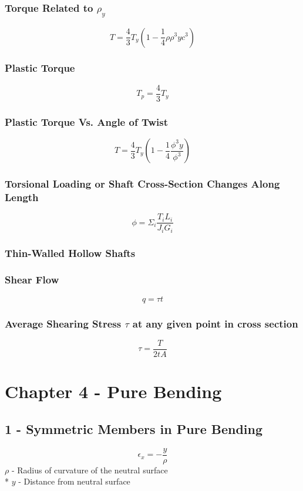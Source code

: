 \documentclass[10pt,landscape]{article}
\begin{document}
\begin{multicols}{3}
\subsubsection{Torque Related to $\rho_y$}
\begin{equation}
    T=\frac{4}{3}T_y(1-\frac{1}{4}\rho{\rho^3y}{c^3})
\end{equation}
\subsubsection{Plastic Torque}
\begin{equation}
    T_p=\frac{4}{3}T_y
\end{equation}
\subsubsection{Plastic Torque Vs. Angle of Twist}
\begin{equation}
    T=\frac{4}{3}T_y(1-\frac{1}{4}\frac{\phi^3y}{\phi^3})
\end{equation}
\subsubsection{Torsional Loading or Shaft Cross-Section Changes Along Length}
\begin{equation}
    \phi=\Sigma_i\frac{T_iL_i}{J_iG_i}
\end{equation}
\subsubsection{Thin-Walled Hollow Shafts}
\subsubsection{Shear Flow}
\begin{equation}
    q=\tau t
\end{equation}
\subsubsection{Average Shearing Stress $\tau$ at any given point in cross section}
\begin{equation}
    \tau=\frac{T}{2tA}
\end{equation}

\section{Chapter 4 - Pure Bending}
\subsection{1 - Symmetric Members in Pure Bending}
\begin{equation}
    \epsilon_x=-\frac{y}{\rho}
\end{equation}
$\rho$ - Radius of curvature of the neutral surface\\*
$y$ - Distance from neutral surface

\end{multicols}
\end{document}
